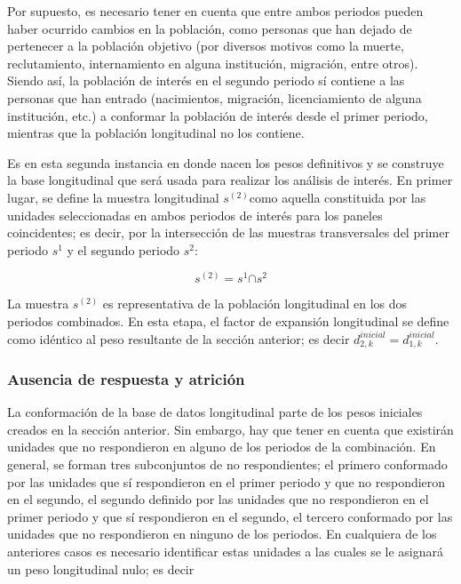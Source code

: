 \documentclass[
  10pt,
  spanish,
]{book}
\begin{document}
Por supuesto, es necesario tener en cuenta que entre ambos periodos pueden haber ocurrido cambios en la población, como personas que han dejado de pertenecer a la población objetivo (por diversos motivos como la muerte, reclutamiento, internamiento en alguna institución, migración, entre otros). Siendo así, la población de interés en el segundo periodo sí contiene a las personas que han entrado (nacimientos, migración, licenciamiento de alguna institución, etc.) a conformar la población de interés desde el primer periodo, mientras que la población longitudinal no los contiene.

Es en esta segunda instancia en donde nacen los pesos definitivos y se construye la base longitudinal que será usada para realizar los análisis de interés. En primer lugar, se define la muestra longitudinal \(s^{(2)}\)como aquella constituida por las unidades seleccionadas en ambos periodos de interés para los paneles coincidentes; es decir, por la intersección de las muestras transversales del primer periodo \(s^1\) y el segundo periodo \(s^2\):

\[
s^{(2)} = s^1 \boldsymbol\cap s^2
\]

La muestra \(s^{(2)}\) es representativa de la población longitudinal en los dos periodos combinados. En esta etapa, el factor de expansión longitudinal se define como idéntico al peso resultante de la sección anterior; es decir \(d_{2, k}^{inicial} = d_{1, k}^{inicial}\).

\hypertarget{ausencia-de-respuesta-y-atriciuxf3n}{%
\subsubsection*{Ausencia de respuesta y atrición}\label{ausencia-de-respuesta-y-atriciuxf3n}}

La conformación de la base de datos longitudinal parte de los pesos iniciales creados en la sección anterior. Sin embargo, hay que tener en cuenta que existirán unidades que no respondieron en alguno de los periodos de la combinación. En general, se forman tres subconjuntos de no respondientes; el primero conformado por las unidades que sí respondieron en el primer periodo y que no respondieron en el segundo, el segundo definido por las unidades que no respondieron en el primer periodo y que sí respondieron en el segundo, el tercero conformado por las unidades que no respondieron en ninguno de los periodos. En cualquiera de los anteriores casos es necesario identificar estas unidades a las cuales se le asignará un peso longitudinal nulo; es decir
\end{document}
